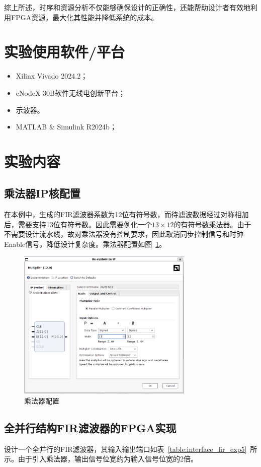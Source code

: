 综上所述，时序和资源分析不仅能够确保设计的正确性，还能帮助设计者有效地利用FPGA资源，最大化其性能并降低系统的成本。

\section{实验使用软件/平台}
\begin{itemize}
  \item Xilinx Vivado 2024.2；
  \item eNodeX 30B软件无线电创新平台；
  \item 示波器。
  \item MATLAB \& Simulink R2024b；
\end{itemize}
\section{实验内容}
\subsection{乘法器IP核配置}
在本例中，生成的FIR滤波器系数为12位有符号数，而待滤波数据经过对称相加后，需要支持13位有符号数。因此需要例化一个$13\times 12$的有符号数乘法器。由于不需要设计流水线，故对乘法器没有控制要求，因此取消同步控制信号和时钟Enable信号，降低设计复杂度。乘法器配置如图~\ref{fig:exp5:mult}。
\begin{figure}[htbp]
  \centering
  \includegraphics[width=0.75\textwidth]{figure/exp5/mult_settings.png}
  \caption{乘法器配置}
  \label{fig:exp5:mult}
\end{figure}

\subsection{全并行结构FIR滤波器的FPGA实现}
设计一个全并行的FIR滤波器，其输入输出端口如表~\ref{table:interface_fir_exp5}~所示。由于引入乘法器，输出信号位宽约为输入信号位宽的2倍。

